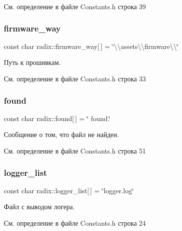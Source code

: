 См. определение в файле Constants.\+h строка 39

\mbox{\label{namespaceradix_a123392a7ece6e11efaf3ad3df291ff3d}} 
\subsubsection{\texorpdfstring{firmware\+\_\+way}{firmware\_way}}
{\footnotesize\ttfamily const char radix\+::firmware\+\_\+way\mbox{[}$\,$\mbox{]} = \char`\"{}\textbackslash{}\textbackslash{}assets\textbackslash{}\textbackslash{}firmware\textbackslash{}\textbackslash{}\char`\"{}}

Путь к прошивкам. 

См. определение в файле Constants.\+h строка 33

\mbox{\label{namespaceradix_a27726ea7eb8e2bea153425bce9328be5}} 
\subsubsection{\texorpdfstring{found}{found}}
{\footnotesize\ttfamily const char radix\+::found\mbox{[}$\,$\mbox{]} = \char`\"{} found.\char`\"{}}

Сообщение о том, что файл не найден. 

См. определение в файле Constants.\+h строка 51

\mbox{\label{namespaceradix_a11c5bfe5c65a0f88a2a950111c6ffc09}} 
\subsubsection{\texorpdfstring{logger\+\_\+list}{logger\_list}}
{\footnotesize\ttfamily const char radix\+::logger\+\_\+list\mbox{[}$\,$\mbox{]} = \char`\"{}logger.\+log\char`\"{}}

Файл с выводом логера. 

См. определение в файле Constants.\+h строка 24

\mbox{\label{namespaceradix_a9f0187ab8d7f9931ed08159a233408c0}} 
